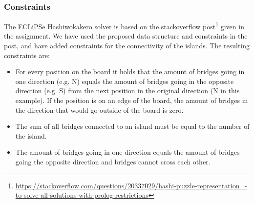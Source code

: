 \documentclass{report}
\begin{document}
\subsubsection{Constraints}
The ECLiPSe Hashiwokakero solver is based on the stackoverflow post\footnote{\url{https://stackoverflow.com/questions/20337029/hashi-puzzle-representation\_-to-solve-all-solutions-with-prolog-restrictions}} given in the assignment. We have used the proposed data structure and constraints in the post, and have added constraints for the connectivity of the islands. The resulting constraints are:
\begin{itemize}
	\item For every position on the board it holds that the amount of bridges going in one direction (e.g. N) equals the amount of bridges going in the opposite direction (e.g. S) from the next position in the original direction (N in this example). If the position is on an edge of the board, the amount of bridges in the direction that would go outside of the board is zero.

        

    \item The sum of all bridges connected to an island must be equal to the number of the island.
        

    \item The amount of bridges going in one direction equals the amount of bridges going the opposite direction and bridges cannot cross each other.
        


\end{itemize}
\end{document}
